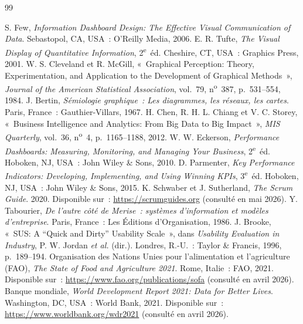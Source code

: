 \documentclass[11pt,a4paper]{report}
\begin{document}
\begin{thebibliography}{99}

 S. Few, \emph{Information Dashboard Design: The Effective Visual Communication of Data}. Sebastopol, CA, USA~: O'Reilly Media, 2006.
 E. R. Tufte, \emph{The Visual Display of Quantitative Information}, 2\textsuperscript{e}~éd. Cheshire, CT, USA~: Graphics Press, 2001.
 W. S. Cleveland et R. McGill, «~Graphical Perception: Theory, Experimentation, and Application to the Development of Graphical Methods~», \emph{Journal of the American Statistical Association}, vol.~79, n\textsuperscript{o}~387, p.~531--554, 1984.
 J. Bertin, \emph{Sémiologie graphique~: Les diagrammes, les réseaux, les cartes}. Paris, France~: Gauthier-Villars, 1967.
 H. Chen, R. H. L. Chiang et V. C. Storey, «~Business Intelligence and Analytics: From Big Data to Big Impact~», \emph{MIS Quarterly}, vol.~36, n\textsuperscript{o}~4, p.~1165--1188, 2012.
 W. W. Eckerson, \emph{Performance Dashboards: Measuring, Monitoring, and Managing Your Business}, 2\textsuperscript{e}~éd. Hoboken, NJ, USA~: John Wiley \& Sons, 2010.
 D. Parmenter, \emph{Key Performance Indicators: Developing, Implementing, and Using Winning KPIs}, 3\textsuperscript{e}~éd. Hoboken, NJ, USA~: John Wiley \& Sons, 2015.
 K. Schwaber et J. Sutherland, \emph{The Scrum Guide}. 2020. Disponible sur~: \url{https://scrumguides.org} (consulté en mai 2026).
 Y. Tabourier, \emph{De l'autre côté de Merise~: systèmes d'information et modèles d'entreprise}. Paris, France~: Les Éditions d'Organisation, 1986.
 J. Brooke, «~SUS: A ``Quick and Dirty'' Usability Scale~», dans \emph{Usability Evaluation in Industry}, P. W. Jordan \emph{et al.} (dir.). Londres, R.-U.~: Taylor \& Francis, 1996, p.~189--194.
 Organisation des Nations Unies pour l'alimentation et l'agriculture (FAO), \emph{The State of Food and Agriculture 2021}. Rome, Italie~: FAO, 2021. Disponible sur~: \url{https://www.fao.org/publications/sofa} (consulté en avril 2026).
 Banque mondiale, \emph{World Development Report 2021: Data for Better Lives}. Washington, DC, USA~: World Bank, 2021. Disponible sur~: \url{https://www.worldbank.org/wdr2021} (consulté en avril 2026).


\end{thebibliography}
\end{document}
